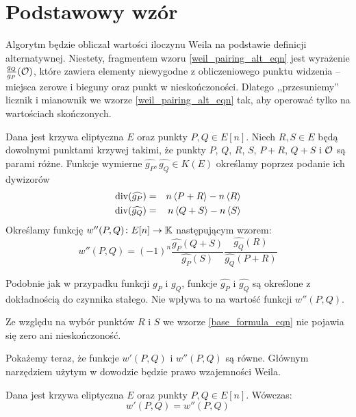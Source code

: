 \section{Podstawowy wzór}

Algorytm będzie obliczał wartości iloczynu Weila
na podstawie definicji alternatywnej.
Niestety, fragmentem wzoru \ref{weil_pairing_alt_eqn}
jest wyrażenie $\frac{g_Q}{g_P}(\mathcal{O})$,
które zawiera elementy niewygodne z obliczeniowego punktu widzenia --
miejsca zerowe i bieguny oraz punkt w nieskończoności.
Dlatego ,,przesuniemy'' licznik i mianownik
we wzorze \ref{weil_pairing_alt_eqn} tak,
aby operować tylko na wartościach skończonych.

\begin{definition}
Dana jest krzywa eliptyczna $E$ oraz punkty $P, Q \in E[n]$.
Niech $R, S \in E$ będą dowolnymi punktami krzywej takimi,
że punkty $P$, $Q$, $R$, $S$, $P+R$, $Q+S$ i $\mathcal{O}$ są parami różne.
Funkcje wymierne $\widehat{g_P}, \widehat{g_Q} \in K(E)$
określamy poprzez podanie ich dywizorów
\begin{eqnarray*}
\operatorname{div}(\widehat{g_P}) & = & n\left\langle P+R\right\rangle - n\left\langle R\right\rangle \\
\operatorname{div}(\widehat{g_Q}) & = & n\left\langle Q+S\right\rangle - n\left\langle S\right\rangle
\end{eqnarray*}
Określamy funkcję $w''(P, Q)\colon E[n] \to \mathbb{K}$
następującym wzorem:
\begin{equation}\label{base_formula_eqn}
w''(P, Q) = (-1)^n\frac{\widehat{g_P}(Q+S)}{\widehat{g_P}(S)}
            \frac{\widehat{g_Q}(R)}{\widehat{g_Q}(P+R)}
\end{equation}
\end{definition}

\begin{remark}
Podobnie jak w przypadku funkcji $g_P$ i $g_Q$,
funkcje $\widehat{g_P}$ i $\widehat{g_Q}$
są określone z dokładnością do czynnika stałego.
Nie wpływa to na wartość funkcji $w''(P, Q)$.
\end{remark}

\begin{remark}
Ze względu na wybór punktów $R$ i $S$
we wzorze \ref{base_formula_eqn} nie pojawia się zero ani nieskończoność.
\end{remark}

Pokażemy teraz, że funkcje $w'(P, Q)$ i $w''(P, Q)$ są równe.
Głównym narzędziem użytym w dowodzie będzie prawo wzajemności Weila.

\begin{theorem}
Dana jest krzywa eliptyczna $E$ oraz punkty $P, Q \in E[n]$.
Wówczas:
\begin{equation}
w'(P, Q) = w''(P, Q)
\end{equation}
\end{theorem}

